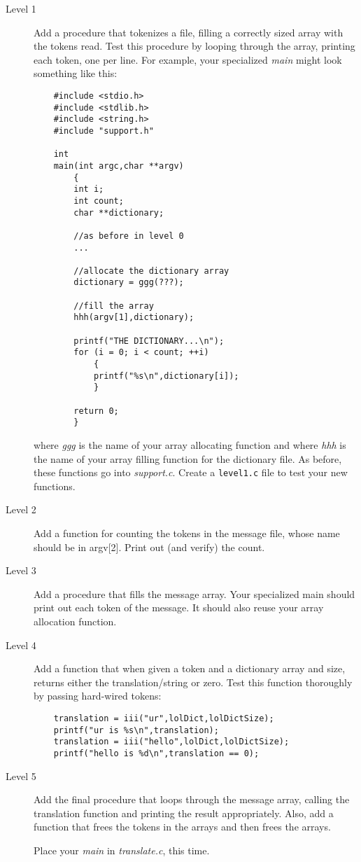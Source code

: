 \documentclass[12pt]{article}
\begin{document}
\begin{description}
\item[Level 1]
Add a procedure that tokenizes a file, filling a
correctly sized array with
the tokens read.
Test this procedure by looping through the array,
printing each token, one per line.
For example, your specialized {\it main} might look something like this:

\begin{verbatim}
    #include <stdio.h>
    #include <stdlib.h>
    #include <string.h>
    #include "support.h"

    int
    main(int argc,char **argv)
        {
        int i;
        int count;
        char **dictionary;

        //as before in level 0
        ...

        //allocate the dictionary array
        dictionary = ggg(???);
        
        //fill the array
        hhh(argv[1],dictionary);

        printf("THE DICTIONARY...\n");
        for (i = 0; i < count; ++i)
            {
            printf("%s\n",dictionary[i]);
            }

        return 0;
        }
\end{verbatim}

where {\it ggg} is
the name of your array allocating function
and where {\it hhh} is
the name of your array filling function for the dictionary file.
As before, these functions go into {\it support.c}.
Create a \verb!level1.c! file to test your new functions.

\item[Level 2]
Add a function for counting the tokens in the message file,
whose name should be in argv[2]. Print out (and verify) the
count.

\item[Level 3]
Add a procedure that fills the message array. Your specialized
main should print out each token of the message.
It should also reuse your array allocation function.

\item[Level 4]
Add a function that when given a token and a dictionary array 
and size, returns either the translation/string or zero.
Test this function thoroughly by passing hard-wired tokens:

\begin{verbatim}
    translation = iii("ur",lolDict,lolDictSize);
    printf("ur is %s\n",translation);
    translation = iii("hello",lolDict,lolDictSize);
    printf("hello is %d\n",translation == 0);
\end{verbatim}

\item[Level 5]
Add the final procedure that loops through the
message array, calling the translation function and
printing the result appropriately.
Also, add a function that frees the tokens in the arrays and then
frees the arrays.

Place your {\it main} in {\it translate.c}, this time.

\end{description}
\end{document}

